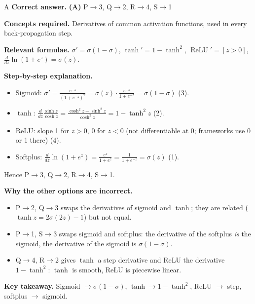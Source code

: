 \documentclass[11pt,a4paper]{article}
\newcommand{\qsep}{\par\vspace{2pt}{\color{black!15}\hrule}\vspace{4pt}}
\begin{document}
\begin{solbox}{A}
\textbf{\color{brand}Correct answer.} \textcolor{okgreen}{\textbf{(A)}} P$\to$3, Q$\to$2, R$\to$4, S$\to$1

\textbf{\color{brand}Concepts required.} Derivatives of common activation functions, used in every back-propagation step.

\textbf{\color{brand}Relevant formulae.} $\sigma' = \sigma(1 - \sigma)$, $\tanh' = 1 - \tanh^2$, $\operatorname{ReLU}' = [z > 0]$, $\frac{d}{dz}\ln(1 + e^z) = \sigma(z)$.

\textbf{\color{brand}Step-by-step explanation.} \begin{itemize}\itemsep0pt
\item Sigmoid: $\sigma' = \frac{e^{-z}}{(1 + e^{-z})^2} = \sigma(z)\cdot\frac{e^{-z}}{1 + e^{-z}} = \sigma(1 - \sigma)$ (3).
\item $\tanh$: $\frac{d}{dz}\frac{\sinh z}{\cosh z} = \frac{\cosh^2 z - \sinh^2 z}{\cosh^2 z} = 1 - \tanh^2 z$ (2).
\item ReLU: slope 1 for $z > 0$, 0 for $z < 0$ (not differentiable at 0; frameworks use 0 or 1 there) (4).
\item Softplus: $\frac{d}{dz}\ln(1 + e^z) = \frac{e^z}{1 + e^z} = \frac{1}{1 + e^{-z}} = \sigma(z)$ (1).
\end{itemize}
Hence P$\to$3, Q$\to$2, R$\to$4, S$\to$1.

\textbf{\color{brand}Why the other options are incorrect.}
\begin{itemize}[leftmargin=2.4em, itemsep=1pt, topsep=2pt]
\item[\textbf{(B)}] P$\to$2, Q$\to$3 swaps the derivatives of sigmoid and $\tanh$; they are related ($\tanh z = 2\sigma(2z) - 1$) but not equal.
\item[\textbf{(C)}] P$\to$1, S$\to$3 swaps sigmoid and softplus: the derivative of the softplus \emph{is} the sigmoid, the derivative of the sigmoid is $\sigma(1 - \sigma)$.
\item[\textbf{(D)}] Q$\to$4, R$\to$2 gives $\tanh$ a step derivative and ReLU the derivative $1 - \tanh^2$: $\tanh$ is smooth, ReLU is piecewise linear.
\end{itemize}
\textbf{\color{brand}Key takeaway.} Sigmoid $\to\sigma(1 - \sigma)$, $\tanh \to 1 - \tanh^2$, ReLU $\to$ step, softplus $\to$ sigmoid.
\end{solbox}
\qsep
\end{document}
